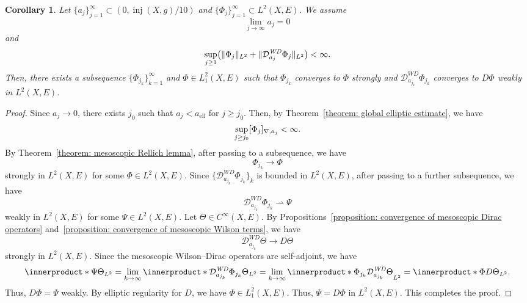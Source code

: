 \documentclass[a4paper,oneside,12pt]{amsart}
\theoremstyle{plain}
\newtheorem{corollary}[theorem]{Corollary}
\theoremstyle{definition}
\theoremstyle{remark}
\DeclarePairedDelimiter{\norm}{\lVert}{\rVert}
\DeclarePairedDelimiter{\seminorm}{\lbrack}{\rbrack}
\DeclareMathOperator{\injectivityradius}{inj}
\newcommand{\Ltwonorm}[2][L^2]{\norm{#2}_{#1}}
\newcommand{\mesoscopicdifferenceseminorm}[2][a]{\seminorm{#2}_{\nabla,#1}}
\newcommand{\mesoscopicWilsonDiracoperator}[1][a]{\mathcal{D}_{#1}^{\mathit{WD}}}
\newcommand{\constantAell}{a_{\mathrm{ell}}}
\begin{document}
\begin{corollary}\label{corollary: mesoscopic elliptic and Rellich}
  Let $\{a_j\}_{j=1}^{\infty} \subset (0,\injectivityradius(X,g)/10)$ and $\{\Phi_j\}_{j=1}^{\infty} \subset L^2(X,E)$.
  We assume
  \begin{equation}
    \lim_{j \to \infty} a_j = 0
  \end{equation}
  and
  \begin{equation}
    \sup_{j \ge 1} \bigl( \Ltwonorm{\Phi_j} + \Ltwonorm{\mesoscopicWilsonDiracoperator[a_j]\Phi_j} \bigr) < \infty.
  \end{equation}
  Then, there exists a subsequence $\{\Phi_{j_k}\}_{k=1}^{\infty}$ and $\Phi \in L^2_1(X,E)$ such that $\Phi_{j_k}$ converges to $\Phi$ strongly and $\mesoscopicWilsonDiracoperator[a_{j_k}] \Phi_{j_k}$ converges to $D\Phi$ weakly in $L^2(X,E)$.
\end{corollary}
\begin{proof}
  Since $a_j \to 0$, there exists $j_0$ such that $a_j < \constantAell$ for $j \ge j_0$.
  Then, by Theorem~\ref{theorem: global elliptic estimate}, we have
  \begin{equation}
    \sup_{j \ge j_0} \mesoscopicdifferenceseminorm[a_j]{\Phi_j} < \infty.
  \end{equation}
  By Theorem~\ref{theorem: mesoscopic Rellich lemma}, after passing to a subsequence, we have
  \begin{equation}
    \Phi_{j_k} \to \Phi
  \end{equation}
  strongly in $L^2(X,E)$ for some $\Phi \in L^2(X,E)$.
  Since $\{ \mesoscopicWilsonDiracoperator[a_{j_k}]\Phi_{j_k} \}_k$ is bounded in $L^2(X,E)$, after passing to a further subsequence, we have
  \begin{equation}
    \mesoscopicWilsonDiracoperator[a_{j_k}] \Phi_{j_k} \rightharpoonup \Psi
  \end{equation}
  weakly in $L^2(X,E)$ for some $\Psi \in L^2(X,E)$.
  Let $\Theta \in C^{\infty}(X,E)$.
  By Propositions~\ref{proposition: convergence of mesoscopic Dirac operators} and~\ref{proposition: convergence of mesoscopic Wilson terms}, we have
  \begin{equation}
    \mesoscopicWilsonDiracoperator[a_{j_k}]\Theta \to D\Theta
  \end{equation}
  strongly in $L^2(X,E)$.
  Since the mesoscopic Wilson--Dirac operators are self-adjoint, we have
  \begin{equation}
    \innerproduct*{\Psi}{\Theta}_{L^2} = \lim_{k \to \infty} \innerproduct*{\mesoscopicWilsonDiracoperator[a_{j_k}]\Phi_{j_k}}{\Theta}_{L^2} = \lim_{k \to \infty} \innerproduct*{\Phi_{j_k}}{\mesoscopicWilsonDiracoperator[a_{j_k}]\Theta}_{L^2} = \innerproduct*{\Phi}{D\Theta}_{L^2}.
  \end{equation}
  Thus, $D\Phi=\Psi$ weakly.
  By elliptic regularity for $D$, we have $\Phi \in L^2_1(X,E)$.
  Thus, $\Psi = D\Phi$ in $L^2(X,E)$.
  This completes the proof.
\end{proof}
\end{document}
